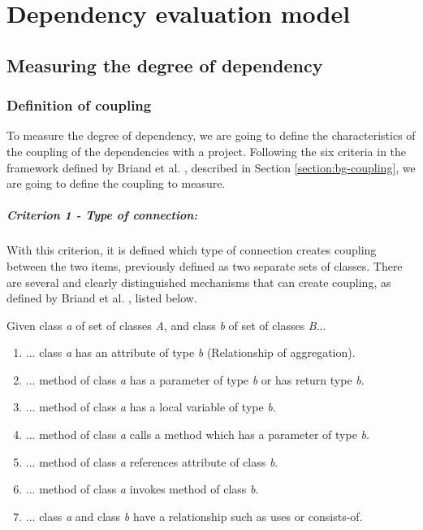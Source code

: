 \chapter{Dependency evaluation model}\label{ch:TheoreticModel}

\section{Measuring the degree of dependency}\label{sect:degree-dependency}
\subsection{Definition of coupling}\label{subsect:defCoupling}
To measure the degree of dependency, we are going to define the characteristics of the coupling of the dependencies with a project. Following the six criteria in the framework defined by Briand et al. \cite{briand1999unified}, described in Section \ref{section:bg-coupling}, we are going to define the coupling to measure.

\paragraph{Criterion 1 - Type of connection:}
With this criterion, it is defined which type of connection creates coupling between the two items, previously defined as two separate sets of classes. There are several and clearly distinguished mechanisms that can create coupling, as defined by Briand et al. \cite{briand1999unified}, listed below.

\blankls
Given class \textit{a} of set of classes \textit{A}, and class \textit{b} of set of classes \textit{B}...

\begin{enumerate}
  \item ... class \textit{a} has an attribute of type \textit{b} (Relationship of aggregation).
  \item ... method of class \textit{a} has a parameter of type \textit{b} or has return type \textit{b}.
  \item ... method of class \textit{a} has a local variable of type \textit{b}.
  \item ... method of class \textit{a} calls a method which has a parameter of type \textit{b}.
  \item ... method of class \textit{a} references attribute of class \textit{b}.
  \item ... method of class \textit{a} invokes method of class \textit{b}.
  \item ... class \textit{a} and class \textit{b} have a relationship such as uses or consists-of.
\end{enumerate}

